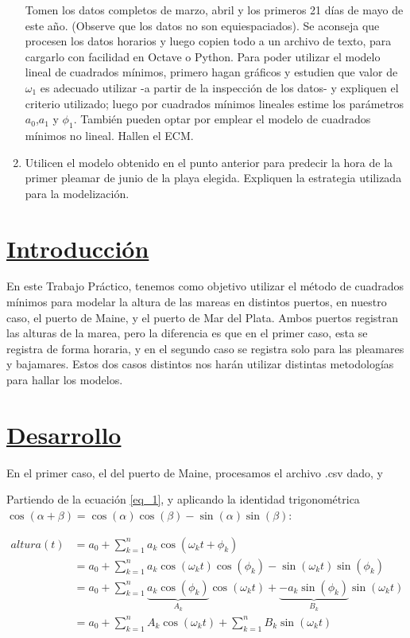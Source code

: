 \documentclass[10pt,a4paper]{article}
\numberwithin{equation}{section}
\numberwithin{figure}{section}
\numberwithin{table}{section}
\begin{document}
\begin{enumerate}
    Tomen los datos completos de marzo, abril y los primeros 21 días de mayo de este año. (Observe que los datos no son equiespaciados). Se aconseja que procesen los datos horarios y luego copien todo a un archivo de texto, para cargarlo con facilidad en Octave o Python.
    Para poder utilizar el modelo lineal de cuadrados mínimos, primero hagan gráficos y estudien que valor de $\omega_1$ es adecuado utilizar -a partir de la inspección de los datos- y expliquen el criterio utilizado; luego por cuadrados mínimos lineales estime los parámetros $a_0$,$a_1$ y $\phi_1$.
    También pueden optar por emplear el modelo de cuadrados mínimos no lineal.
    Hallen el ECM.\\
    
    \item
    Utilicen el modelo obtenido en el punto anterior para predecir la hora de la primer pleamar de junio de la playa elegida. Expliquen la estrategia utilizada para la modelización.
    
\end{enumerate}


\section{\underline{Introducción}}

En este Trabajo Práctico, tenemos como objetivo utilizar el método de cuadrados mínimos para modelar la altura de las mareas en distintos puertos, en nuestro caso, el puerto de Maine, y el puerto de Mar del Plata.
Ambos puertos registran las alturas de la marea, pero la diferencia es que en el primer caso, esta se registra de forma horaria, y en el segundo caso se registra solo para las pleamares y bajamares.
Estos dos casos distintos nos harán utilizar distintas metodologías para hallar los modelos.

\section{\underline{Desarrollo}}

En el primer caso, el del puerto de Maine, procesamos el archivo .csv dado, y 

Partiendo de la ecuación \ref*{eq_1}, y aplicando la identidad trigonométrica $ \cos(\alpha+\beta) = \cos(\alpha)\cos(\beta) - \sin(\alpha)\sin(\beta) $:

\begin{equation}\label{eqn:eq_3}
    \begin{split}
        altura(t) &= a_0 + \sum_{k=1}^{n} a_k \cos(\omega_k t + \phi_k) \\
                  &= a_0 + \sum_{k=1}^{n} a_k  \cos(\omega_k t)\cos(\phi_k) -  \sin(\omega_k t)\sin(\phi_k)  \\
                  &= a_0 + \sum_{k=1}^{n} \underbrace{a_k \cos(\phi_k)}_{A_k} \cos(\omega_k t) + \underbrace{ - a_k \sin(\phi_k)}_{B_k} \sin(\omega_k t) \\
                  &= a_0 + \sum_{k=1}^{n} A_k \cos(\omega_k t)  + \sum_{k=1}^{n} B_k \sin(\omega_k t)
    \end{split}    
\end{equation}
\end{document}
